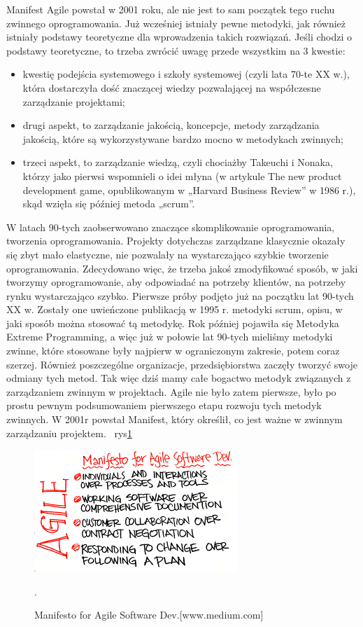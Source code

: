 Manifest Agile powstał w 2001 roku, ale nie jest to sam początek tego ruchu zwinnego oprogramowania. Już wcześniej istniały pewne metodyki, jak również istniały podstawy teoretyczne dla wprowadzenia takich rozwiązań. Jeśli chodzi o podstawy teoretyczne, to trzeba zwrócić uwagę przede wszystkim na 3 kwestie:
	\begin{itemize}
		\item kwestię podejścia systemowego i szkoły systemowej (czyli lata 70-te XX w.),
		która dostarczyła dość znaczącej wiedzy pozwalającej na współczesne zarządzanie projektami;
		\item drugi aspekt, to zarządzanie jakością, koncepcje, metody zarządzania jakością, które są wykorzystywane bardzo mocno w metodykach zwinnych;
		\item trzeci aspekt, to zarządzanie wiedzą, czyli chociażby Takeuchi i Nonaka,
		którzy jako pierwsi wspomnieli o idei młyna (w artykule The new product development game,
		opublikowanym w „Harvard Business Review” w 1986 r.), skąd wzięła się później metoda „scrum”.
	\end{itemize}
W latach 90-tych zaobserwowano znaczące skomplikowanie oprogramowania, tworzenia oprogramowania.
Projekty dotychczas zarządzane klasycznie okazały się zbyt mało elastyczne, nie pozwalały na wystarczająco szybkie tworzenie oprogramowania.
Zdecydowano więc, że trzeba jakoś zmodyfikować sposób, w jaki tworzymy oprogramowanie, aby odpowiadać na potrzeby klientów,
na potrzeby rynku wystarczająco szybko. Pierwsze próby podjęto już na początku lat 90-tych XX w. Zostały one uwieńczone publikacją w 1995 r.
metodyki scrum, opisu, w jaki sposób można stosować tą metodykę. Rok później pojawiła się Metodyka Extreme Programming,
a więc już w połowie lat 90-tych mieliśmy metodyki zwinne, które stosowane były najpierw w ograniczonym zakresie, potem coraz szerzej.
Również poszczególne organizacje, przedsiębiorstwa zaczęły tworzyć swoje odmiany tych metod.
Tak więc dziś mamy całe bogactwo metodyk związanych z zarządzaniem zwinnym w projektach.
Agile nie było zatem pierwsze, było po prostu pewnym podsumowaniem pierwszego etapu rozwoju tych metodyk zwinnych.
W 2001r powstał Manifest, który określił, co jest ważne w zwinnym zarządzaniu projektem. 
~rys\ref{rys:agile}

\begin{figure}
	\centering\includegraphics[width=.6\textwidth]{img/agile}
	\caption{Manifesto for Agile Software Dev.[www.medium.com]}.\label{rys:agile}%
\end{figure}

